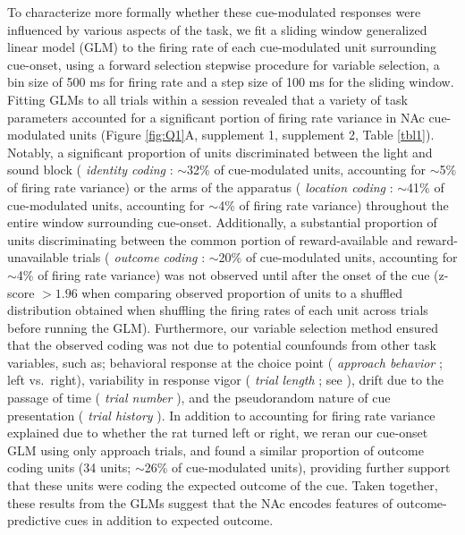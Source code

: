 \documentclass[11pt]{article}
\let\citeNP=\citealt
\providecommand{\DIFadd}[1]{{\protect\color{red} \sf #1}} %
\providecommand{\DIFaddbegin}{} %
\newcommand{\DIFaddincludegraphics}[2][]{{\color{red}\fbox{\DIFOincludegraphics[#1]{#2}}}} %
\DeclareRobustCommand{\DIFaddbegin}{\DIFOaddbegin \let\includegraphics\DIFaddincludegraphics} %
\begin{document}
\DIFaddbegin \DIFadd{To characterize more formally whether these cue-modulated responses were influenced by various aspects of the task, we fit a sliding window generalized linear model (GLM) to the firing rate of each cue-modulated unit surrounding cue-onset, using a forward selection stepwise procedure for variable selection, a bin size of 500 ms for firing rate and a step size of 100 ms for the sliding window. Fitting GLMs to all trials within a session revealed that a variety of task parameters accounted for a significant portion of firing rate variance in NAc cue-modulated units (Figure \ref{fig:Q1}A, supplement 1, supplement 2, Table \ref{tbl1}). Notably, a significant proportion of units discriminated between the light and sound block (}{\it \DIFadd{identity coding}}\DIFadd{: $\sim$32\% of cue-modulated units, accounting for $\sim$5\% of firing rate variance) or the arms of the apparatus (}{\it \DIFadd{location coding}}\DIFadd{: $\sim$41\% of cue-modulated units, accounting for $\sim$4\% of firing rate variance) throughout the entire window surrounding cue-onset. Additionally, a substantial proportion of units discriminating between the common portion of reward-available and reward-unavailable trials (}{\it \DIFadd{outcome coding}}\DIFadd{: $\sim$20\% of cue-modulated units, accounting for $\sim$4\% of firing rate variance) was not observed until after the onset of the cue (z-score $>1.96$ when comparing observed proportion of units to a shuffled distribution obtained when shuffling the firing rates of each unit across trials before running the GLM). Furthermore, our variable selection method ensured that the observed coding was not due to potential counfounds from other task variables, such as; behavioral response at the choice point (}{\it \DIFadd{approach behavior}}\DIFadd{; left vs.\ right), variability in response vigor (}{\it \DIFadd{trial length}}\DIFadd{; see \citeNP{McGinty2013}), drift due to the passage of time (}{\it \DIFadd{trial number}}\DIFadd{), and the pseudorandom nature of cue presentation (}{\it \DIFadd{trial history}}\DIFadd{). In addition to accounting for firing rate variance explained due to whether the rat turned left or right, we reran our cue-onset GLM using only approach trials, and found a similar proportion of outcome coding units (34 units; $\sim$26\% of cue-modulated units), providing further support that these units were coding the expected outcome of the cue. Taken together, these results from the GLMs suggest that the NAc encodes features of outcome-predictive cues in addition to expected outcome. 
}
\end{document}
